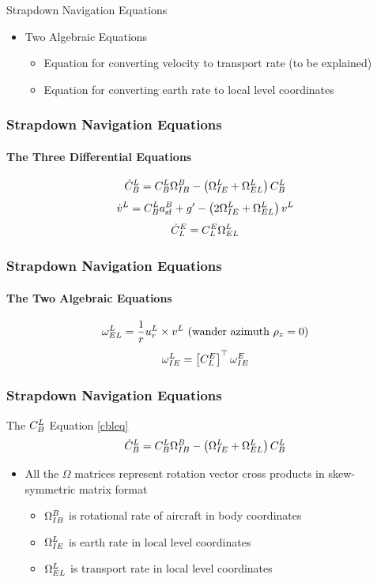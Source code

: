 \begin{frame}
Strapdown Navigation Equations
 \begin{itemize}
 \item Two Algebraic Equations
 \begin{itemize}
   \item Equation for converting velocity to transport rate (to be explained)
   \item Equation for converting earth rate to local level
   coordinates
 \end{itemize}
\end{itemize}
\end{frame}
\begin{frame}
\frametitle{Strapdown Navigation Equations}
\framesubtitle{The Three Differential Equations}
\begin{equation}\label{cbleq}
  \dot{C}_B^L=C_{B}^{L}\Omega_{IB}^B - \left( \Omega_{IE}^L+\Omega_{EL}^L\right)C_{B}^{L}
\end{equation}
\begin{equation}\label{strapveleq}
  \dot{v}^L=C_{B}^{L}a_{\text{sf}}^B+ g'-\left(2\Omega_{IE}^L + \Omega_{EL}^L \right)v^L
\end{equation}
\begin{equation}\label{cleeq}
  \dot{C}_L^E=C_L^E\Omega_{EL}^L
\end{equation}
\end{frame}

\begin{frame}
\frametitle{Strapdown Navigation Equations}
\framesubtitle{The Two Algebraic Equations}
\begin{equation}\label{trateeq}
  \omega_{EL}^L=\dfrac{1}{r}u_r^L\times v^L \text{ (wander azimuth $\rho_z=0$)}
\end{equation}
\begin{equation}\label{erateeq}
  \omega_{IE}^L=\left[C_{L}^{E} \right]^\top \omega_{IE}^E
\end{equation}
\end{frame}

\begin{frame}
\frametitle{Strapdown Navigation Equations}
The $C_{B}^{L}$ Equation \eqref{cbleq}
\[\dot{C}_B^L=C_{B}^{L}\Omega_{IB}^B - \left( \Omega_{IE}^L+\Omega_{EL}^L\right)C_{B}^{L}\]
\begin{itemize}
\item All the $\Omega$ matrices represent rotation vector cross products in skew-symmetric matrix format
\begin{itemize}
 \item $\Omega_{IB}^B$ is rotational rate of aircraft in body
coordinates
\item $\Omega_{IE}^L$ is earth rate in local level coordinates
\item $\Omega_{EL}^L$ is transport rate in local level
coordinates
\end{itemize}
\end{itemize}
\end{frame}


